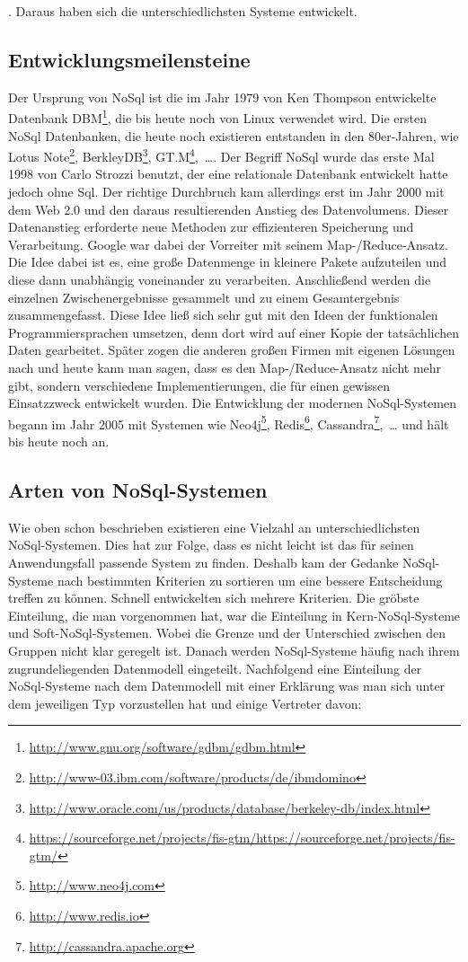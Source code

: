 . Daraus haben sich die unterschiedlichsten Systeme entwickelt.

\subsection{Entwicklungsmeilensteine}
Der Ursprung von NoSql ist die im Jahr 1979 von Ken Thompson entwickelte
Datenbank DBM\footnote{\url{http://www.gnu.org/software/gdbm/gdbm.html}}, die
bis heute noch von Linux verwendet wird. Die ersten NoSql Datenbanken, die
heute noch existieren entstanden in den 80er-Jahren, wie
Lotus Note\footnote{\url{http://www-03.ibm.com/software/products/de/ibmdomino}},
BerkleyDB\footnote{\url{http://www.oracle.com/us/products/database/berkeley-db/index.html}},
GT.M\footnote{\url{https://sourceforge.net/projects/fis-gtm/https://sourceforge.net/projects/fis-gtm/}},~\dots .
Der Begriff NoSql wurde das erste Mal 1998 von Carlo Strozzi benutzt, der eine
relationale Datenbank entwickelt hatte jedoch ohne Sql. Der richtige Durchbruch
kam allerdings erst im Jahr 2000 mit dem Web 2.0 und den daraus resultierenden
Anstieg des Datenvolumens. Dieser Datenanstieg erforderte neue Methoden zur
effizienteren Speicherung und Verarbeitung. Google war dabei der Vorreiter mit
seinem Map-/Reduce-Ansatz. Die Idee dabei ist es, eine große Datenmenge in
kleinere Pakete aufzuteilen und diese dann unabhängig voneinander zu verarbeiten.
Anschließend werden die einzelnen Zwischenergebnisse gesammelt und zu einem
Gesamtergebnis zusammengefasst. Diese Idee ließ sich sehr gut mit den Ideen
der funktionalen Programmiersprachen umsetzen, denn dort wird auf einer Kopie
der tatsächlichen Daten gearbeitet. Später zogen die anderen großen Firmen mit
eigenen Lösungen nach und heute kann man sagen, dass es den Map-/Reduce-Ansatz
nicht mehr gibt, sondern verschiedene Implementierungen, die für einen gewissen
Einsatzzweck entwickelt wurden. Die Entwicklung der modernen NoSql-Systemen
begann im Jahr 2005 mit Systemen wie Neo4j\footnote{\url{http://www.neo4j.com}},
Redis\footnote{\url{http://www.redis.io}},
Cassandra\footnote{\url{http://cassandra.apache.org}},~\dots{} und hält bis
heute noch an.

\subsection{Arten von NoSql-Systemen}
Wie oben schon beschrieben existieren eine Vielzahl an unterschiedlichsten
NoSql-Systemen. Dies hat zur Folge, dass es nicht leicht ist das für seinen
Anwendungsfall passende System zu finden. Deshalb kam der Gedanke NoSql-Systeme
nach bestimmten Kriterien zu sortieren um eine bessere Entscheidung treffen zu
können. Schnell entwickelten sich mehrere Kriterien. Die gröbste Einteilung,
die man vorgenommen hat, war die Einteilung in Kern-NoSql-Systeme und
Soft-NoSql-Systemen. Wobei die Grenze und der Unterschied zwischen den Gruppen
nicht klar geregelt ist. Danach werden NoSql-Systeme häufig nach ihrem
zugrundeliegenden Datenmodell eingeteilt. Nachfolgend eine Einteilung der
NoSql-Systeme nach dem Datenmodell mit einer Erklärung was man sich unter dem
jeweiligen Typ vorzustellen hat und einige Vertreter davon:

